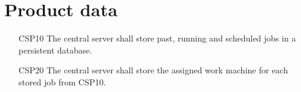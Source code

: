 \section{Product data}
\begin{enumerate}
  \item[CSP10] The central server shall store past, running and scheduled \glspl{job} in a persistent database.
  \item[CSP20] The central server shall store the assigned work machine for each stored \gls{job} from CSP10.
\end{enumerate}
